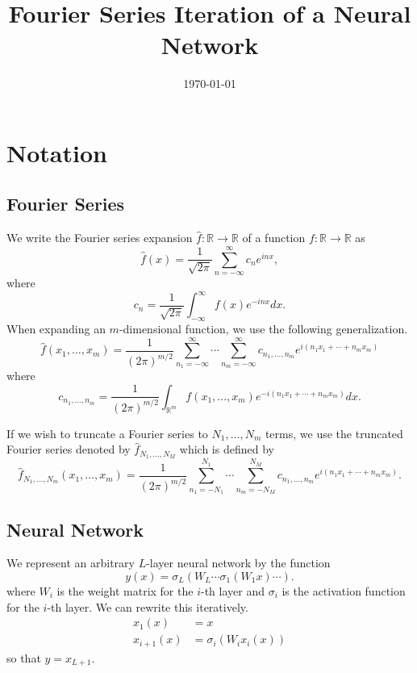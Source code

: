 \documentclass{article}
\title{Fourier Series Iteration of a Neural Network}
\date{\today}
\begin{document}
\maketitle

\section{Notation}
\subsection{Fourier Series}
We write the Fourier series expansion $\hat{f}: \mathbb{R} \to \mathbb{R}$ of a function $f: \mathbb{R} \to \mathbb{R}$ as
\begin{equation}
    \hat{f}(x) = \frac{1}{\sqrt{2\pi}} \sum_{n=-\infty}^{\infty} c_n e^{inx},
\end{equation}
where
\begin{equation}
    c_n = \frac{1}{\sqrt{2\pi}}\int_{-\infty}^{\infty} f(x) e^{-inx} dx.
\end{equation}
When expanding an $m$-dimensional function, we use the following generalization.
\begin{equation}
    \hat{f}(x_1, \ldots, x_m) = \frac{1}{(2\pi)^{m/2}}\sum_{n_1=-\infty}^{\infty} \cdots \sum_{n_m=-\infty}^{\infty} c_{n_1, \ldots, n_m} e^{i(n_1x_1 + \cdots + n_mx_m)}
\end{equation}
where
\begin{equation}
    c_{n_1, \ldots, n_m} = \frac{1}{(2\pi)^{m/2}}\int_{\mathbb{R}^m} f(x_1, \ldots, x_m) e^{-i(n_1x_1 + \cdots + n_mx_m)} dx.
\end{equation}

If we wish to truncate a Fourier series to $N_1, \ldots, N_m$ terms, we use the truncated Fourier series denoted by $\hat{f}_{N_1, \ldots, N_M}$ which is defined by
\begin{equation}
    \hat{f}_{N_1, \ldots, N_m}(x_1, \ldots, x_m) = \frac{1}{(2\pi)^{m/2}}\sum_{n_1=-N_1}^{N_1} \cdots \sum_{n_m=-N_M}^{N_M} c_{n_1, \ldots, n_m} e^{i(n_1x_1 + \cdots + n_mx_m)}.
\end{equation}

\subsection{Neural Network}
We represent an arbitrary $L$-layer neural network by the function
\begin{equation}
    y(x) = \sigma_L(W_L \cdots \sigma_1(W_1 x) \cdots).
\end{equation}
where $W_i$ is the weight matrix for the $i$-th layer and $\sigma_i$ is the activation function for the $i$-th layer. We can rewrite this iteratively.
\begin{align}
    x_1(x) &= x \\
    x_{i+1}(x) &= \sigma_i(W_i x_i(x))
\end{align}
so that $y = x_{L+1}$.
\end{document}
